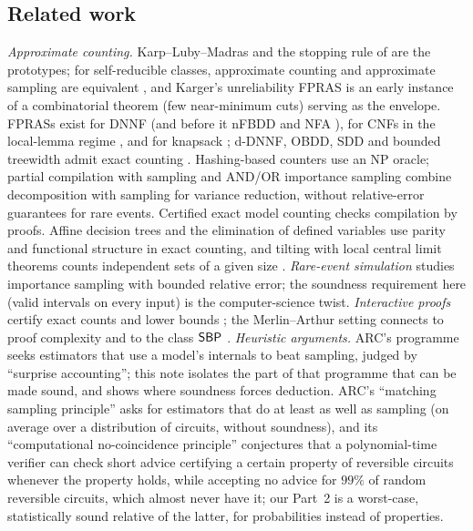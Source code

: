 \subsection{Related work}

\emph{Approximate counting.} Karp--Luby--Madras \cite{klm1989} and the stopping
rule of \cite{dklr2000} are the prototypes; for self-reducible classes, approximate
counting and approximate sampling are equivalent \cite{jvv1986}, and Karger's
unreliability FPRAS \cite{karger1999} is an early instance of a combinatorial
theorem (few near-minimum cuts) serving as the envelope. FPRASs exist for DNNF
\cite{meel2026dnnf} (and before it nFBDD \cite{meel2025nfbdd} and NFA
\cite{arenas2021nfa}), for CNFs in the local-lemma regime
\cite{moitra2019,fgyz2021,fhy2021,jpv2021,hwy2022,wangyin2024}, and for knapsack
\cite{gopalan2011fptas,gkm2010}; d-DNNF, OBDD, SDD and bounded treewidth admit exact
counting \cite{darwiche2002map,darwiche2011sdd,samer2010}. Hashing-based counters
\cite{chakraborty2013approxmc} use an NP oracle; partial compilation with
sampling \cite{lai2023partialkc} and AND/OR importance sampling
\cite{gogate2008andor} combine decomposition with sampling for variance reduction,
without relative-error guarantees for rare events. Certified exact model counting
\cite{bryant2023cpog} checks compilation by proofs. Affine decision trees
\cite{koriche2013} and the elimination of defined variables \cite{lagniez2016} use
parity and functional structure in exact counting, and tilting with local central
limit theorems counts independent sets of a given size \cite{daviesperkins2021,jpss2021}.
\emph{Rare-event simulation} \cite{asmussenglynn2007,bucklew2004} studies
importance sampling with bounded relative error; the soundness requirement
here (valid intervals on every input) is the computer-science twist.
\emph{Interactive proofs} certify exact counts \cite{lfkn1992} and lower bounds
\cite{gs1986}; the Merlin--Arthur setting connects to proof complexity
\cite{cookreckhow1979,kp1998,bpr2000,pudlak2003pairs} and to the class $\mathsf{SBP}$
\cite{bgm2006}.
\emph{Heuristic arguments.} ARC's programme
\cite{christiano2022presumption,hilton2024surprise,wu2024lowprob} seeks estimators
that use a model's internals to beat sampling, judged by ``surprise accounting'';
this note isolates the part of that programme that can be made sound, and shows
where soundness forces deduction. ARC's ``matching sampling principle''
\cite{neyman2025competing} asks for estimators that do at least as well as sampling
(on average over a distribution of circuits, without soundness), and its
``computational no-coincidence principle'' \cite{neyman2025nocoincidence}
conjectures that a polynomial-time verifier can check short advice certifying a
certain property of reversible circuits whenever the property holds, while accepting no
advice for $99\%$ of random reversible circuits, which almost never have it; our
Part~2 is a worst-case, statistically sound relative of the latter, for probabilities
instead of properties.
